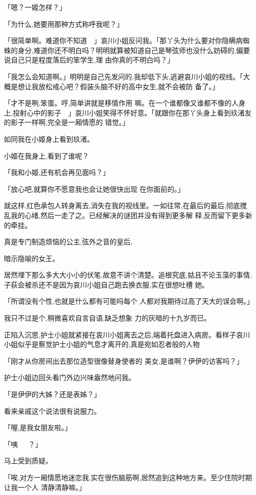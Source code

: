 \documentclass{article}
\begin{document}
「嗯？一姬怎样？」 


「为什么,她要用那种方式称呼我呢？」 

「很简单啊。难道你不知道~~」哀川小姐反问我。「那丫头为什么要对你隐瞒病蜘蛛的身分,难道你还不明白吗？明明就算被知道自己是琴弦师也没什么妨碍的,偏要说自己只是程度落后的笨学生,理
由你真的不明白吗？」 

「我怎么会知道啊。」明明是自己先发问的,我却低下头,逃避哀川小姐的视线。「大概是想让我放松戒心吧？假装头脑不好的高中女生,就不会被防
备了。」 

「才不是咧,笨蛋。哼,简单讲就是移情作用
\newpage
嘛。在一个谁都像又谁都不像的人身上,投射心中的影子~~」哀川小姐笑得不怀好意。「就跟你在那丫头身上看到玖渚友的影子一样啊,完全是一厢情愿的
错觉。」 


如同我在小姬身上看到玖渚。 


小姬在我身上,看到了谁呢？ 


「我和小姬,还有机会再见面吗？」 

「放心吧,就算你不愿意我也会让她很快出现
在你面前的。」 

就这样,红色承包人转身离去,消失在我的视线里。一如往常,在最后的最后,彻底搅乱我的心绪,然后一走了之。已经解决的谜团并没有得到更多解
释,反而留下更多新的牵挂。 

真是专门制造烦恼的公主,弦外之音的皇后,

\newpage
暗示隐喻的女王。 

居然埋下那么多大大小小的伏笔,故意不讲个清楚。追根究底,姑且不论玉藻的事情,子荻会被杀还不是因为哀川小姐自己跑去换衣服,实在很想吐槽
她。 

「所谓没有个性,也就是什么都有可能吗每个
人都对我期待过高了天大的误会啊。」 

我只不过是个,稍微喜欢自言自语,缺乏想象
力的灰暗的十九岁而已。 

正陷入沉思,护士小姐就紧接在哀川小姐离去之后,端着托盘进入病房。看样子哀川小姐似乎是察觉护士小姐的气息才离开的,真是宛如忍者般的人物

「刚才从你房间出去那位造型很像替身使者的
美女,是谁啊？伊伊的访客吗？」 


护士小姐边回头看门外边兴味盎然地问我。 

\newpage


「是伊伊的大姊？还是表姊？」 


看来亲戚这个说法很有说服力。 


「喔,是我女朋友啦。」 


「咦~~~？」 


马上受到质疑。 

「唉,对方一厢情愿地迷恋我,实在很伤脑筋啊,居然追到这种地方来。至少住院时期让我一个人
清静清静嘛。」 
\end{document}
